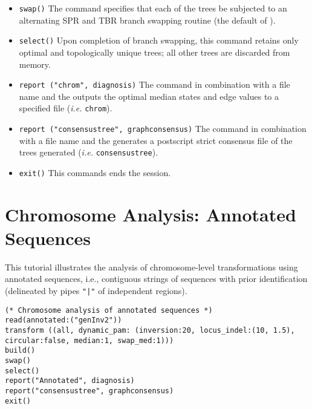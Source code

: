 \begin{itemize}
\item \texttt{swap()} The  command specifies that each of the trees be subjected to an alternating SPR and TBR branch swapping routine (the default of \poy).
\item \texttt{select()} Upon completion of branch swapping, this command retains only optimal and topologically unique trees; all other trees are discarded from memory. 
\item \texttt{report ("chrom", diagnosis)}  The  command in combination with a file name and the  outputs the optimal median states and edge values to a specified file (\emph{i.e.} \texttt{chrom}). 
\item \texttt{report ("consensustree", graphconsensus)}  The  command in combination with a file name and the  generates a postscript strict consensus file of the trees generated (\emph{i.e.} \texttt{consensustree}). 
\item \texttt{exit()} This commands ends the \poy session.
\end{itemize}


\section{Chromosome Analysis: Annotated Sequences}{\label{tutorial 7}}

This tutorial illustrates the analysis of chromosome-level transformations using 
annotated sequences, i.e., contiguous strings of sequences with prior 
identification (delineated by pipes  \texttt{"|"} of independent regions). 

\begin{verbatim}
(* Chromosome analysis of annotated sequences *)
read(annotated:("genInv2"))
transform ((all, dynamic_pam: (inversion:20, locus_indel:(10, 1.5), 
circular:false, median:1, swap_med:1)))
build()
swap()
select()
report("Annotated", diagnosis)
report("consensustree", graphconsensus)
exit()
\end{verbatim}


